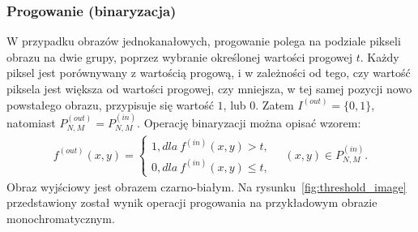 \subsubsection{Progowanie (binaryzacja)} \label{sssec:threshold}
W przypadku obrazów jednokanałowych, progowanie polega na podziale pikseli obrazu na dwie grupy, poprzez wybranie określonej wartości progowej $t$. Każdy piksel jest porównywany z wartością progową, i w zależności od tego, czy wartość piksela jest większa od wartości progowej, czy mniejsza, w tej samej pozycji nowo powstałego obrazu, przypisuje się wartość $1$, lub $0$. Zatem $I^{(out)} = \{0, 1\}$, natomiast $P^{(out)}_{N, M} = P^{(in)}_{N, M}$. Operację binaryzacji można opisać wzorem:
\begin{gather*}
  f^{(out)}(x, y) = \left\{\begin{matrix}
  1, dla \: f^{(in)}(x, y) > t,\\
  0, dla \: f^{(in)}(x, y) \leq t,
  \end{matrix}\right. \quad (x, y) \in P^{(in)}_{N,M}.
\end{gather*}
Obraz wyjściowy jest obrazem czarno-białym.
Na rysunku~\ref{fig:threshold_image} przedstawiony został wynik operacji progowania na przykładowym obrazie monochromatycznym.
